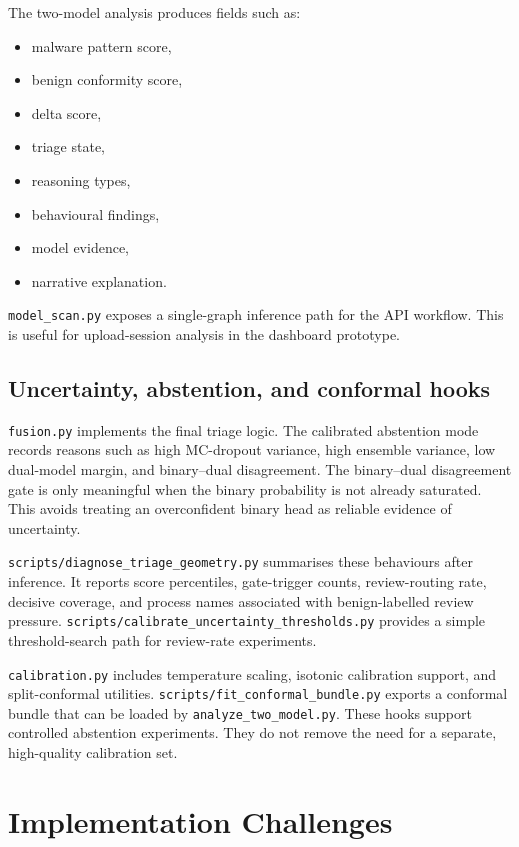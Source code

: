 The two-model analysis produces fields such as:

\begin{itemize}
\item malware pattern score,
\item benign conformity score,
\item delta score,
\item triage state,
\item reasoning types,
\item behavioural findings,
\item model evidence,
\item narrative explanation.
\end{itemize}

\texttt{model\_scan.py} exposes a single-graph inference path for the API workflow. This is useful for upload-session analysis in the dashboard prototype.

\subsection{Uncertainty, abstention, and conformal hooks}

\texttt{fusion.py} implements the final triage logic. The calibrated abstention mode records reasons such as high MC-dropout variance, high ensemble variance, low dual-model margin, and binary--dual disagreement. The binary--dual disagreement gate is only meaningful when the binary probability is not already saturated. This avoids treating an overconfident binary head as reliable evidence of uncertainty.

\texttt{scripts/diagnose\_triage\_geometry.py} summarises these behaviours after inference. It reports score percentiles, gate-trigger counts, review-routing rate, decisive coverage, and process names associated with benign-labelled review pressure. \texttt{scripts/calibrate\_uncertainty\_thresholds.py} provides a simple threshold-search path for review-rate experiments.

\texttt{calibration.py} includes temperature scaling, isotonic calibration support, and split-conformal utilities. \texttt{scripts/fit\_conformal\_bundle.py} exports a conformal bundle that can be loaded by \texttt{analyze\_two\_model.py}. These hooks support controlled abstention experiments. They do not remove the need for a separate, high-quality calibration set.

\section{Implementation Challenges}


